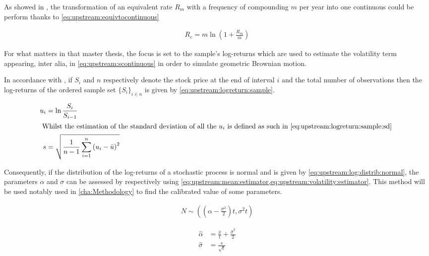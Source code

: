 \documentclass[a4paper, 12pt]{report}
\begin{document}
As showed in \citet{hull}, the transformation of an equivalent rate $R_m$ with a frequency of compounding $m$ per year into one continuous could be perform thanks to \cref{eq:upstream:equivtocontinuous}

\begin{align}
R_c = m \ln \left( 1 + \frac{R_m}{m} \right) \label{eq:upstream:equivtocontinuous}
\end{align}

For what matters in that master thesis, the focus is set to the sample's log-returns which are used to estimate the volatility term appearing, inter alia, in \cref{eq:upstream:scontinuous} in order to simulate geometric Brownian motion.

In accordance with \citet{hull}, if $S_i$ and $n$ respectively denote the stock price at the end of interval $i$ and the total number of observations then the log-returns of the ordered sample set $\{S_i\}_{i \in n}$ is given by \cref{eq:upstream:logreturn:sample}.

\begin{align}
  u_i &= \ln \frac{S_i}{S_{i-1}} \label{eq:upstream:logreturn:sample} \\
  \intertext{
  Whilst the estimation of the standard deviation of all the $u_i$ is defined as such in \cref{eq:upstream:logreturn:sample:sd}
  }
  s &= \sqrt{\frac{1}{n - 1} \sum_{i = 1}^n \left(u_i - \bar{u} \right) ^2} \label{eq:upstream:logreturn:sd} \\
\end{align}

Consequently, if the distribution of the log-returns of a stochastic process is normal and is given by \cref{eq:upstream:log:distrib:normal}, the parameters $\alpha$ and $\sigma$ can be assessed by respectively using \cref{eq:upstream:mean:estimator,eq:upstream:volatility:estimator}.
This method will be used notably used in \cref{cha:Methodology} to find the calibrated value of some parameters.

\begin{align}
  N \sim \left( \left( \alpha - \frac{\sigma^ 2}{2} \right) t, \sigma^2 t \right) \label{eq:upstream:log:distrib:normal}
\end{align}

\begin{align}
  \hat{\alpha} &= \frac{\bar{x}}{t} + \frac{\hat{\sigma}^2}{2} \label{eq:upstream:mean:estimator}\\
  \hat{\sigma} &= \frac{s}{\sqrt{t}} \label{eq:upstream:volatility:estimator}
\end{align}
\end{document}
